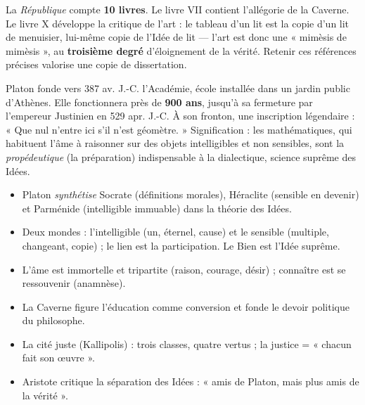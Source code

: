 \documentclass[11pt]{article}
\newcommand{\cle}[1]{{\popxbold\color{popdark}#1}}
\begin{document}
\begin{exemplebox}
La \emph{République} compte \textbf{10 livres}. Le livre VII contient l'allégorie de la Caverne. Le livre X développe la critique de l'art : le tableau d'un lit est la copie d'un lit de menuisier, lui-même copie de l'Idée de lit — l'art est donc une « mimèsis de mimèsis », au \textbf{troisième degré} d'éloignement de la vérité. Retenir ces références précises valorise une copie de dissertation.
\end{exemplebox}

\begin{savaistu}
Platon fonde vers 387 av. J.-C. l'\cle{Académie}, école installée dans un jardin public d'Athènes. Elle fonctionnera près de \textbf{900 ans}, jusqu'à sa fermeture par l'empereur Justinien en 529 apr. J.-C. À son fronton, une inscription légendaire : « Que nul n'entre ici s'il n'est géomètre. » Signification : les mathématiques, qui habituent l'âme à raisonner sur des objets intelligibles et non sensibles, sont la \emph{propédeutique} (la préparation) indispensable à la dialectique, science suprême des Idées.
\end{savaistu}

\begin{aretenir}
\begin{itemize}
\item Platon \emph{ synthétise} Socrate (définitions morales), Héraclite (sensible en devenir) et Parménide (intelligible immuable) dans la théorie des \cle{Idées}.
\item Deux mondes : l'\cle{intelligible} (un, éternel, cause) et le \cle{sensible} (multiple, changeant, copie) ; le lien est la \cle{participation}. Le \cle{Bien} est l'Idée suprême.
\item L'\cle{âme} est immortelle et tripartite (raison, courage, désir) ; connaître est se ressouvenir (\cle{anamnèse}).
\item La \cle{Caverne} figure l'éducation comme conversion et fonde le devoir politique du philosophe.
\item La cité juste (\cle{Kallipolis}) : trois classes, quatre vertus ; la justice = « chacun fait son œuvre ».
\item Aristote critique la \cle{séparation} des Idées : « amis de Platon, mais plus amis de la vérité ».
\end{itemize}
\end{aretenir}
\end{document}
